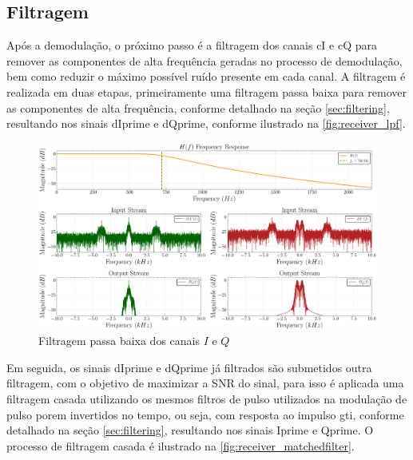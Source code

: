 \subsection{Filtragem}\label{sec:filtragem}

Após a demodulação, o próximo passo é a filtragem dos canais \gls{cI} e \gls{cQ} para remover as componentes de alta frequência geradas no processo de demodulação, bem como reduzir o máximo possível ruído presente em cada canal. A filtragem é realizada em duas etapas, primeiramente uma filtragem passa baixa para remover as componentes de alta frequência, conforme detalhado na seção \ref{sec:filtering}, resultando nos sinais \gls{dIprime} e \gls{dQprime}, conforme ilustrado na \autoref{fig:receiver_lpf}.

\begin{figure}[H]
	\centering
	\caption{Filtragem passa baixa dos canais $I$ e $Q$}\label{fig:receiver_lpf}
	\includegraphics[width=\linewidth]{assets/cap3/receiver_lpf_freq.pdf}
\end{figure}

Em seguida, os sinais \gls{dIprime} e \gls{dQprime} já filtrados são submetidos outra filtragem, com o objetivo de maximizar a \gls{SNR} do sinal, para isso é aplicada uma filtragem casada utilizando os mesmos filtros de pulso utilizados na modulação de pulso porem invertidos no tempo, ou seja, com resposta ao impulso \gls{gti}, conforme detalhado na seção \ref{sec:filtering}, resultando nos sinais \gls{Iprime} e \gls{Qprime}. O processo de filtragem casada é ilustrado na \autoref{fig:receiver_matchedfilter}.

